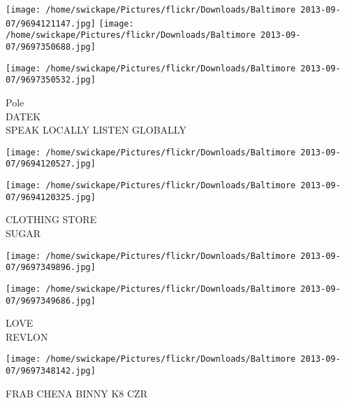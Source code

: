 \documentclass[10pt,letterpaper]{article}
\begin{document}
\texttt{[image: /home/swickape/Pictures/flickr/Downloads/Baltimore 2013-09-07/9694121147.jpg]}
\texttt{[image: /home/swickape/Pictures/flickr/Downloads/Baltimore 2013-09-07/9697350688.jpg]}

\texttt{[image: /home/swickape/Pictures/flickr/Downloads/Baltimore 2013-09-07/9697350532.jpg]}

Pole\\
DATEK\\
SPEAK LOCALLY LISTEN GLOBALLY
\pagebreak

\texttt{[image: /home/swickape/Pictures/flickr/Downloads/Baltimore 2013-09-07/9694120527.jpg]}

\vspace{0.25in}
\texttt{[image: /home/swickape/Pictures/flickr/Downloads/Baltimore 2013-09-07/9694120325.jpg]}

CLOTHING STORE\\
SUGAR
\pagebreak

\texttt{[image: /home/swickape/Pictures/flickr/Downloads/Baltimore 2013-09-07/9697349896.jpg]}

\vspace{0.25in}
\texttt{[image: /home/swickape/Pictures/flickr/Downloads/Baltimore 2013-09-07/9697349686.jpg]}

LOVE\\
REVLON
\pagebreak

\texttt{[image: /home/swickape/Pictures/flickr/Downloads/Baltimore 2013-09-07/9697348142.jpg]}

FRAB CHENA BINNY K8 CZR
\pagebreak
\end{document}
